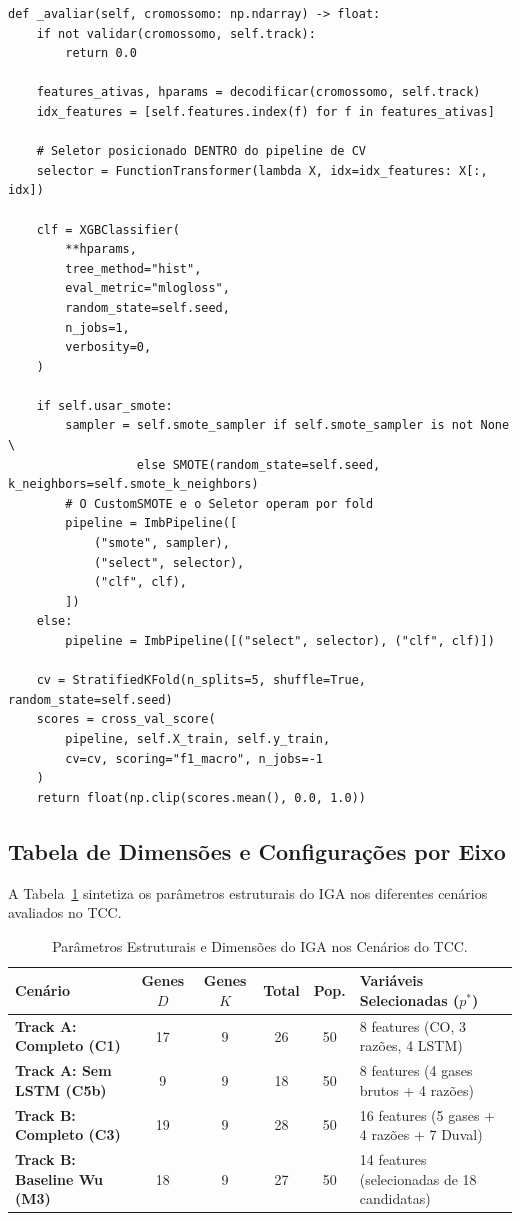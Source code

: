 \documentclass[11pt,a4paper]{article}
\begin{document}
\begin{lstlisting}
def _avaliar(self, cromossomo: np.ndarray) -> float:
    if not validar(cromossomo, self.track):
        return 0.0

    features_ativas, hparams = decodificar(cromossomo, self.track)
    idx_features = [self.features.index(f) for f in features_ativas]
    
    # Seletor posicionado DENTRO do pipeline de CV
    selector = FunctionTransformer(lambda X, idx=idx_features: X[:, idx])

    clf = XGBClassifier(
        **hparams,
        tree_method="hist",
        eval_metric="mlogloss",
        random_state=self.seed,
        n_jobs=1,
        verbosity=0,
    )

    if self.usar_smote:
        sampler = self.smote_sampler if self.smote_sampler is not None \
                  else SMOTE(random_state=self.seed, k_neighbors=self.smote_k_neighbors)
        # O CustomSMOTE e o Seletor operam por fold
        pipeline = ImbPipeline([
            ("smote", sampler),
            ("select", selector),
            ("clf", clf),
        ])
    else:
        pipeline = ImbPipeline([("select", selector), ("clf", clf)])

    cv = StratifiedKFold(n_splits=5, shuffle=True, random_state=self.seed)
    scores = cross_val_score(
        pipeline, self.X_train, self.y_train,
        cv=cv, scoring="f1_macro", n_jobs=-1
    )
    return float(np.clip(scores.mean(), 0.0, 1.0))
\end{lstlisting}

\subsection{Tabela de Dimensões e Configurações por Eixo}
A Tabela~\ref{tab:iga_dimensoes} sintetiza os parâmetros estruturais do IGA nos diferentes cenários avaliados no TCC.

\begin{table}[htbp]
  \centering\small
  \caption{Parâmetros Estruturais e Dimensões do IGA nos Cenários do TCC.}
  \label{tab:iga_dimensoes}
  \begin{tabularx}{\textwidth}{p{4.2cm} c c c c X}
    \toprule
    \textbf{Cenário} & \textbf{Genes $D$} & \textbf{Genes $K$} & \textbf{Total} & \textbf{Pop.} & \textbf{Variáveis Selecionadas ($p^*$)} \\
    \midrule
    \textbf{Track A: Completo (C1)} & 17 & 9 & 26 & 50 & 8 features (CO, 3 razões, 4 LSTM) \\
    \textbf{Track A: Sem LSTM (C5b)} & 9 & 9 & 18 & 50 & 8 features (4 gases brutos + 4 razões) \\
    \textbf{Track B: Completo (C3)} & 19 & 9 & 28 & 50 & 16 features (5 gases + 4 razões + 7 Duval) \\
    \textbf{Track B: Baseline Wu (M3)} & 18 & 9 & 27 & 50 & 14 features (selecionadas de 18 candidatas) \\
    \bottomrule
  \end{tabularx}
\end{table}
\end{document}
